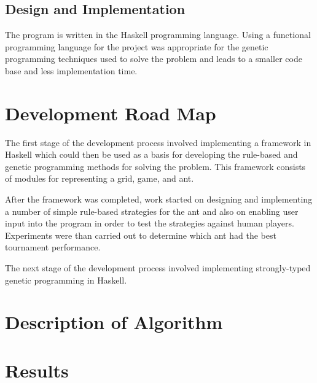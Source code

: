 \documentclass[a4paper, 11pt]{article}
\begin{document}
\subsection{Design and Implementation}

The program is written in the Haskell programming language. Using a
functional programming language for the project was appropriate for the
genetic programming techniques used to solve the problem and leads to
a smaller code base and less implementation time.

\section{Development Road Map}

The first stage of the development process involved implementing a
framework in Haskell which could then be used as a basis for
developing the rule-based and genetic programming methods for solving
the problem. This framework consists of modules for representing a
grid, game, and ant.

After the framework was completed, work started on designing and
implementing a number of simple rule-based strategies for the ant and
also on enabling user input into the program in order to test the
strategies against human players. Experiments were than carried out to
determine which ant had the best tournament performance.

The next stage of the development process involved implementing
strongly-typed genetic programming in Haskell.

\section{Description of Algorithm}

\section{Results}
\end{document}
